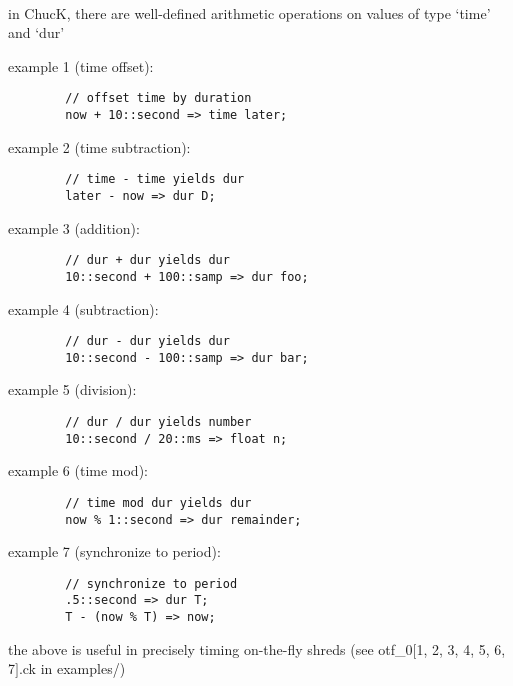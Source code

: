 \\
in ChucK, there are well-defined arithmetic operations on values of type `time' and `dur'

example 1 (time offset):
\begin{verbatim}
        // offset time by duration
        now + 10::second => time later;
\end{verbatim}


example 2 (time subtraction):
\begin{verbatim}
        // time - time yields dur
        later - now => dur D;
\end{verbatim}

example 3 (addition):
\begin{verbatim}
        // dur + dur yields dur
        10::second + 100::samp => dur foo;
\end{verbatim}


example 4 (subtraction):
\begin{verbatim}
        // dur - dur yields dur
        10::second - 100::samp => dur bar;
\end{verbatim}


example 5 (division):
\begin{verbatim}
        // dur / dur yields number
        10::second / 20::ms => float n;
\end{verbatim}


example 6 (time mod):
\begin{verbatim}
        // time mod dur yields dur
        now % 1::second => dur remainder;
\end{verbatim}

example 7 (synchronize to period):
\begin{verbatim}
        // synchronize to period
        .5::second => dur T;
        T - (now % T) => now;
\end{verbatim}

the above is useful in precisely timing on-the-fly shreds (see otf\_0$[$1, 2, 3, 4, 5, 6, 7$]$.ck in examples/)

